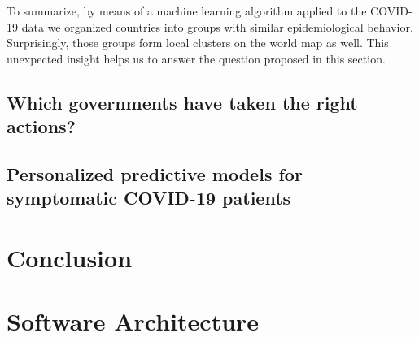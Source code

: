 \documentclass[11pt,a4paper]{article}
\begin{document}


To summarize, by means of a machine learning algorithm applied to the COVID-19
data we organized countries into groups with similar epidemiological behavior.
Surprisingly, those groups form local clusters on the world map as well. This
unexpected insight helps us to answer the question proposed in this section.

\subsection{Which governments have taken the right actions?}
\subsection{Personalized predictive models for symptomatic COVID-19 patients}
\section{Conclusion}

\section{Software Architecture}

\printbibliography
\end{document}
